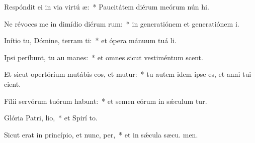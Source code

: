 \item Respóndit ei in via virtú æ:~* Paucitátem diérum meórum nún hi.
\item Ne révoces me in dimídio diérum rum:~* in generatiónem et generatiónem  i.
\item Inítio tu, Dómine, terram ti:~* et ópera mánuum tuá  li.
\item Ipsi períbunt, tu au manes:~* et omnes sicut vestiméntum scent.
\item Et sicut opertórium mutábis eos, et mutur:~* tu autem idem ipse es, et anni tui  cient.
\item Fílii servórum tuórum habunt:~* et semen eórum in sǽculum tur.
\item Glória Patri,  lio,~* et Spirí to.
\item Sicut erat in princípio, et nunc,  per,~* et in sǽcula sæcu. men.
